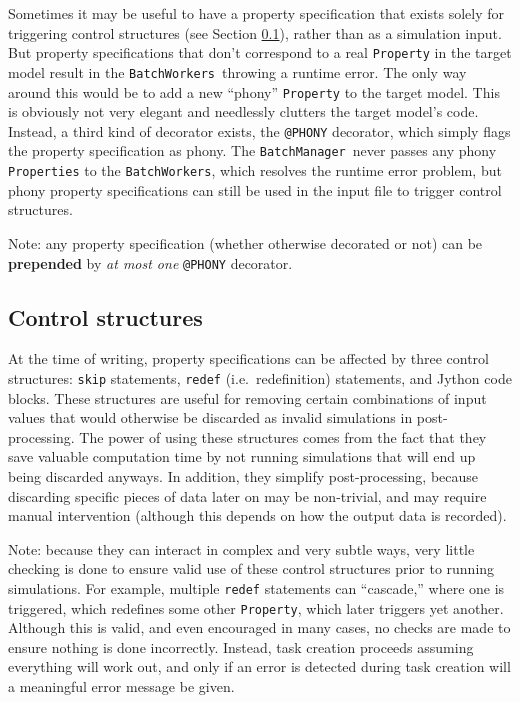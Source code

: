 \documentclass{article}
\newcommand{\BM}{{\tt BatchManager}}
\newcommand{\BWs}{{\tt BatchWorkers}}
\begin{document}
Sometimes it may be useful to have a property specification that exists solely for triggering control structures (see Section \ref{psl:control-struct}), rather than as a simulation input. But property specifications that don't correspond to a real {\tt Property} in the target model result in the \BWs\ throwing a runtime error. The only way around this would be to add a new ``phony'' {\tt Property} to the target model. This is obviously not very elegant and needlessly clutters the target model's code. Instead, a third kind of decorator exists, the {\tt @PHONY} decorator, which simply flags the property specification as phony. The \BM\ never passes any phony {\tt Properties} to the \BWs, which resolves the runtime error problem, but phony property specifications can still be used in the input file to trigger control structures.

\begin{sideblock}
Note: any property specification (whether otherwise decorated or not) can be \textbf{prepended} by \textit{at most one} {\tt @PHONY} decorator.
\end{sideblock}

\subsection{Control structures}
\label{psl:control-struct}

At the time of writing, property specifications can be affected by three control structures: {\tt skip} statements, {\tt redef} (i.e.\ redefinition) statements, and Jython code blocks. These structures are useful for removing certain combinations of input values that would otherwise be discarded as invalid simulations in post-processing. The power of using these structures comes from the fact that they save valuable computation time by not running simulations that will end up being discarded anyways. In addition, they simplify post-processing, because discarding specific pieces of data later on may be non-trivial, and may require manual intervention (although this depends on how the output data is recorded).

\begin{sideblock}
Note: because they can interact in complex and very subtle ways, very little checking is done to ensure valid use of these control structures prior to running simulations. For example, multiple {\tt redef} statements can ``cascade,'' where one is triggered, which redefines some other {\tt Property}, which later triggers yet another. Although this is valid, and even encouraged in many cases, no checks are made to ensure nothing is done incorrectly. Instead, task creation proceeds assuming everything will work out, and only if an error is detected during task creation will a meaningful error message be given.
\end{sideblock}
\end{document}
